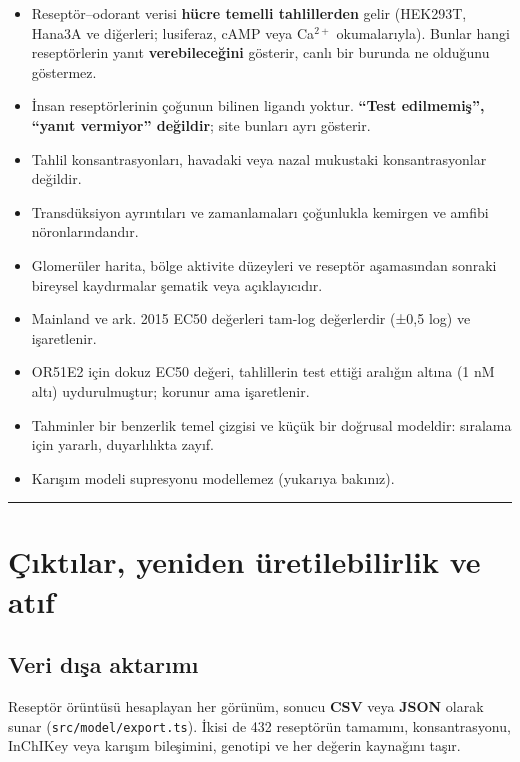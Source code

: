 \documentclass[11pt,a4paper]{article}
\begin{document}
\begin{itemize}
\item Reseptör–odorant verisi \textbf{hücre temelli tahlillerden} gelir (HEK293T, Hana3A ve diğerleri; lusiferaz, cAMP veya Ca\(^{2+}\) okumalarıyla). Bunlar hangi reseptörlerin yanıt \textbf{verebileceğini} gösterir, canlı bir burunda ne olduğunu göstermez.
\item İnsan reseptörlerinin çoğunun bilinen ligandı yoktur. \textbf{``Test edilmemiş'', ``yanıt vermiyor'' değildir}; site bunları ayrı gösterir.
\item Tahlil konsantrasyonları, havadaki veya nazal mukustaki konsantrasyonlar değildir.
\item Transdüksiyon ayrıntıları ve zamanlamaları çoğunlukla kemirgen ve amfibi nöronlarındandır.
\item Glomerüler harita, bölge aktivite düzeyleri ve reseptör aşamasından sonraki bireysel kaydırmalar şematik veya açıklayıcıdır.
\item Mainland ve ark. 2015 EC50 değerleri tam-log değerlerdir (±0,5 log) ve işaretlenir.
\item OR51E2 için dokuz EC50 değeri, tahlillerin test ettiği aralığın altına (1 nM altı) uydurulmuştur; korunur ama işaretlenir.
\item Tahminler bir benzerlik temel çizgisi ve küçük bir doğrusal modeldir: sıralama için yararlı, duyarlılıkta zayıf.
\item Karışım modeli supresyonu modellemez (yukarıya bakınız).
\end{itemize}


\vspace{0.4\baselineskip}
\hrule
\vspace{0.9\baselineskip}


\section{Çıktılar, yeniden üretilebilirlik ve atıf}


\subsection{Veri dışa aktarımı}

Reseptör örüntüsü hesaplayan her görünüm, sonucu \textbf{CSV} veya \textbf{JSON} olarak sunar (\texttt{\small src/model/export.ts}). İkisi de 432 reseptörün tamamını, konsantrasyonu, InChIKey veya karışım bileşimini, genotipi ve her değerin kaynağını taşır.
\end{document}

